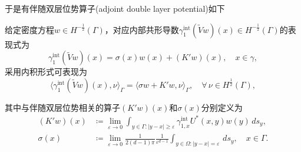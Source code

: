 于是有伴随双层位势算子(adjoint double layer potential)如下
\begin{lemma}[伴随双层位势算子]
  \label{lemma:adjoint-double-layer-potential-def}
  给定密度方程$w \in H^{-\frac{1}{2}}(\Gamma)$，对应内部共形导数$\gamma_{1}^{\text{int}} \left( \widetilde{V} w \right)(x) \in H^{-\frac{1}{2}}(\Gamma)$的表现式为
  \begin{equation*}
    \gamma_{1}^{\text{int}} \left( \widetilde{V} w \right)(x) = \sigma(x) w(x) + \left( K' w \right)(x), \quad x \in \gamma,
  \end{equation*}
采用内积形式可表现为
\begin{equation*}
  \langle
  \gamma_{1}^{\text{int}} \left( \widetilde{V} w \right)(x),
  \nu
  \rangle_{\Gamma}
  = \langle \sigma w + K' w, \nu \rangle_{\Gamma}, \quad \forall \, \nu \in H^{\frac{1}{2}}(\Gamma),
\end{equation*}

其中与伴随双层位势相关的算子$\left( K' w \right)(x)$和$\sigma(x)$分别定义为
\begin{align}
  \label{eq:bvp-adjoint-double-layer-potential-k}
  \left( K' w \right)(x) &\coloneqq \lim_{\varepsilon \rightarrow 0}
  \int_{y \in \Gamma : \left| y - x \right| \ge \varepsilon}
  \gamma_{1,x}^{\text{int}} U^{*}(x,y) w(y) \, d s_y, \\
  \label{eq:bvp-adjoint-double-layer-potential-sigma}
  \sigma(x) &\coloneqq \lim_{\varepsilon \rightarrow 0}
  \frac{1}{2(d-1) \pi} \frac{1}{\varepsilon^{d-1}}
  \int_{y \in \Omega: \left| y - x \right| = \varepsilon} \, d s_y, \quad x \in \Gamma.
\end{align}
\end{lemma}

